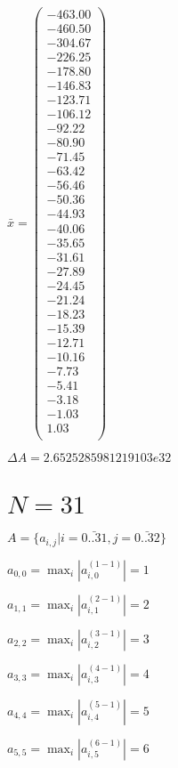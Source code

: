 \documentclass[a4paper,12pt]{article}
\begin{document}
$\bar { x } = \begin{pmatrix}
-463.00 \\
-460.50 \\
-304.67 \\
-226.25 \\
-178.80 \\
-146.83 \\
-123.71 \\
-106.12 \\
-92.22 \\
-80.90 \\
-71.45 \\
-63.42 \\
-56.46 \\
-50.36 \\
-44.93 \\
-40.06 \\
-35.65 \\
-31.61 \\
-27.89 \\
-24.45 \\
-21.24 \\
-18.23 \\
-15.39 \\
-12.71 \\
-10.16 \\
-7.73 \\
-5.41 \\
-3.18 \\
-1.03 \\
1.03 \\
\end{pmatrix}
$

$\Delta A = 2.6525285981219103e32$



\section{ $N = 31$ }
$A = \{ a _{ i, j } | i = \bar { 0..31 }, j = \bar { 0..32 } \}$

$a _{ 0, 0 } =  \max _i |a _{ i, 0 } ^{ (1 - 1) } | = 1$

$a _{ 1, 1 } =  \max _i |a _{ i, 1 } ^{ (2 - 1) } | = 2$

$a _{ 2, 2 } =  \max _i |a _{ i, 2 } ^{ (3 - 1) } | = 3$

$a _{ 3, 3 } =  \max _i |a _{ i, 3 } ^{ (4 - 1) } | = 4$

$a _{ 4, 4 } =  \max _i |a _{ i, 4 } ^{ (5 - 1) } | = 5$

$a _{ 5, 5 } =  \max _i |a _{ i, 5 } ^{ (6 - 1) } | = 6$
\end{document}
